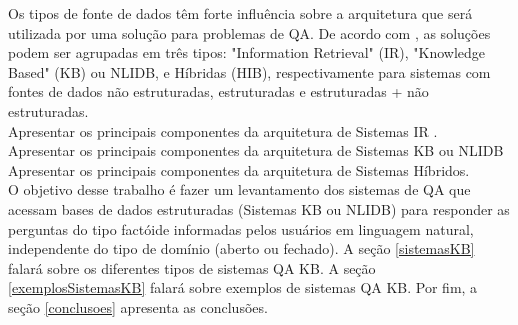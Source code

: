 \documentclass{article}
\begin{document}
Os tipos de fonte de dados têm forte influência sobre a arquitetura que será utilizada por uma solução para problemas de QA. De acordo com \citep{speech}, as soluções podem ser agrupadas em três tipos: "Information Retrieval" (IR), "Knowledge Based" (KB) ou NLIDB, e Híbridas (HIB), respectivamente para sistemas com fontes de dados não estruturadas, estruturadas e estruturadas + não estruturadas.\\

Apresentar os principais componentes da arquitetura de Sistemas IR \citep{kolomiyets2011survey}.\\

Apresentar os principais componentes da arquitetura de Sistemas KB ou NLIDB\\

Apresentar os principais componentes da arquitetura de Sistemas Híbridos.\\

O objetivo desse trabalho é fazer um levantamento dos sistemas de QA que acessam bases de dados estruturadas (Sistemas KB ou NLIDB) para responder as perguntas do tipo factóide informadas pelos usuários em linguagem natural, independente do tipo de domínio (aberto ou fechado). A seção \ref{sistemasKB} falará sobre os diferentes tipos de sistemas QA KB. A seção \ref{exemplosSistemasKB} falará sobre exemplos de sistemas QA KB. Por fim, a seção \ref{conclusoes} apresenta as conclusões.







\end{document}
